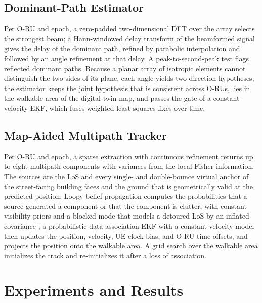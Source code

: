 \documentclass[conference]{IEEEtran}
\begin{document}
\subsection{Dominant-Path Estimator}
Per O-RU and epoch, a zero-padded two-dimensional DFT over the array
selects the strongest beam; a Hann-windowed delay transform of the
beamformed signal gives the delay of the dominant path, refined by
parabolic interpolation and followed by an angle refinement at that
delay. A peak-to-second-peak test flags reflected dominant paths.
Because a planar array of isotropic elements cannot distinguish the two
sides of its plane, each angle yields two direction hypotheses; the
estimator keeps the joint hypothesis that is consistent across O-RUs,
lies in the walkable area of the digital-twin map, and passes the gate
of a constant-velocity EKF, which fuses weighted least-squares fixes
over time.

\subsection{Map-Aided Multipath Tracker}
Per O-RU and epoch, a sparse extraction with continuous refinement
returns up to eight multipath components with variances from the local Fisher information. The sources
are the LoS and every single- and double-bounce virtual anchor of the
street-facing building faces and the ground that is geometrically valid
at the predicted position. Loopy belief propagation computes the
probabilities that a source generated a component or that the component
is clutter, with constant visibility priors and a blocked mode that
models a detoured LoS by an inflated covariance \cite{meyer2018message};
a probabilistic-data-association EKF with a
constant-velocity model then updates the position, velocity, UE clock
bias, and O-RU time offsets, and projects the position onto the
walkable area. A grid search over the walkable area initializes the
track and re-initializes it after a loss of association.

\section{Experiments and Results}
\end{document}
